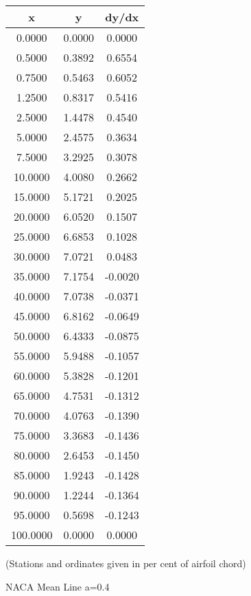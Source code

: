 \documentclass[11pt]{book}
\begin{document}
 \vspace{8mm}
 \begin{tabular}{|c|c|c|}  \hline
 x & y & dy/dx \\
 \hline
0.0000 & 0.0000 & 0.0000 \\
0.5000 & 0.3892 & 0.6554 \\
0.7500 & 0.5463 & 0.6052 \\
1.2500 & 0.8317 & 0.5416 \\
2.5000 & 1.4478 & 0.4540 \\
5.0000 & 2.4575 & 0.3634 \\
7.5000 & 3.2925 & 0.3078 \\
10.0000 & 4.0080 & 0.2662 \\
15.0000 & 5.1721 & 0.2025 \\
20.0000 & 6.0520 & 0.1507 \\
25.0000 & 6.6853 & 0.1028 \\
30.0000 & 7.0721 & 0.0483 \\
35.0000 & 7.1754 & -0.0020 \\
40.0000 & 7.0738 & -0.0371 \\
45.0000 & 6.8162 & -0.0649 \\
50.0000 & 6.4333 & -0.0875 \\
55.0000 & 5.9488 & -0.1057 \\
60.0000 & 5.3828 & -0.1201 \\
65.0000 & 4.7531 & -0.1312 \\
70.0000 & 4.0763 & -0.1390 \\
75.0000 & 3.3683 & -0.1436 \\
80.0000 & 2.6453 & -0.1450 \\
85.0000 & 1.9243 & -0.1428 \\
90.0000 & 1.2244 & -0.1364 \\
95.0000 & 0.5698 & -0.1243 \\
100.0000 & 0.0000 & 0.0000 \\
 \hline
 \end{tabular}
 \vspace{8mm}

(Stations and ordinates given in per cent of airfoil chord)

 \newpage
 \label{mla=0.4}
 \begin{Large}
 NACA Mean Line a=0.4
 \end{Large}
  
\end{document}
